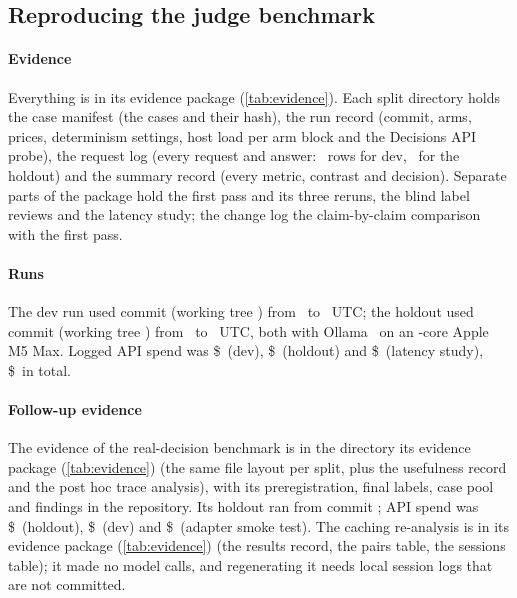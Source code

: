 \subsection{Reproducing the judge benchmark}\label{jb:sec:repro}

\paragraph{Evidence} Everything is in its evidence package (\cref{tab:evidence}). Each split
directory holds the case manifest (the cases and their hash), the run record (commit, arms, prices,
determinism settings, host load per arm block and the Decisions API probe), the request log
(every request and answer: \DevRequestsLogged\ rows for dev, \HoldRequestsLogged\ for the holdout) and
the summary record (every metric, contrast and decision). Separate parts of the package hold the first pass
and its three reruns, the blind label reviews and the latency study;
the change log the claim-by-claim comparison with the first pass.

\paragraph{Runs} The dev run used commit \code{\DevCommit} (working tree \DevDirty) from \DevStarted\ to
\DevEnded\ UTC; the holdout used commit \code{\HoldCommit} (working tree \HoldDirty) from \HoldStarted\ to
\HoldEnded\ UTC, both with Ollama \HoldOllama\ on an \HoldCPUs-core Apple M5 Max. Logged API spend was
\$\DevSpendUSD\ (dev), \$\HoldSpendUSD\ (holdout) and \$\LatencySpendUSD\ (latency study),
\$\LoggedSpendTotal\ in total.

\paragraph{Follow-up evidence} The evidence of the real-decision benchmark is in the directory
its evidence package (\cref{tab:evidence}) (the same file layout per split, plus
the usefulness record and the post hoc trace analysis), with its preregistration, final
labels, case pool and findings in the repository. Its holdout ran from commit
\code{\TrCommit}; API spend was \$\TrSpendHold\ (holdout), \$\TrSpendDev\ (dev) and \$\TrSpendSmoke\
(adapter smoke test). The caching re-analysis is in its evidence package (\cref{tab:evidence})
(the results record, the pairs table, the sessions table); it made no model calls, and regenerating it
needs local session logs that are not committed.

